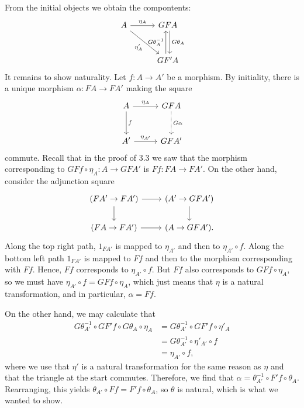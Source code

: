 From the initial objects we obtain the compontents:
\[\begin{tikzcd}[row sep=1cm, column sep=1cm]
	A\ar[r, "\eta_A"]\ar[dr, "\eta'_A" below left] & GFA\ar[d, shift left, "G\theta_A" right]\\
	& GF'A\ar[u, shift left, "G\theta^{-1}_A" left]
\end{tikzcd}\]
It remains to show naturality. Let $f\colon A\to A'$ be a morphism. By initiality,
there is a unique morphism $\alpha\colon FA\to FA'$ making the square
\[\begin{tikzcd}[row sep=1cm, column sep=1cm]
	A\ar[r, "\eta_A"]\ar[d, "f"] & GFA\ar[d, "G\alpha", densely dotted]\\
	A'\ar[r, "\eta_{A'}"]& GFA'
\end{tikzcd}\]
commute. Recall that in the proof of 3.3 we saw that the morphism corresponding
to $GFf \circ \eta_A\colon A\to GFA'$ is $Ff\colon FA\to FA'$. On the other hand,
consider the adjunction square
\[\begin{tikzcd}
	(FA'\to FA')\ar[r]\ar[d] & (A'\to GFA')\ar[d]\\
	(FA\to FA')\ar[r] & (A\to GFA').
\end{tikzcd}\]
Along the top right path, $1_{FA'}$ is mapped to $\eta_{A'}$ and then to
$\eta_{A'}\circ f$. Along the bottom left path $1_{FA'}$ is mapped to $Ff$ and
then to the morphism corresponding with $Ff$. Hence, $Ff$ corresponds to
$\eta_{A'}\circ f$. But $Ff$ also corresponds to $GFf \circ \eta_A$, so
we must have $\eta_{A'} \circ f = GFf \circ \eta_A$, which just means that
$\eta$ is a natural transformation, and in particular, $\alpha = Ff$.

On the other hand, we may calculate that
\begin{align*}
	G\theta_{A'}^{-1} \circ GF'f \circ G\theta_A \circ \eta_A &=
	G\theta_{A'}^{-1} \circ GF'f \circ \eta'_A\\
	&= G\theta^{-1}_{A'}\circ \eta'_{A'} \circ f\\
	&= \eta_{A'} \circ f,
\end{align*}
where we use that $\eta'$ is a natural transformation for the same reason as
$\eta$ and that the triangle at the start commutes.
Therefore, we find that $\alpha = \theta_{A'}^{-1} \circ F'f \circ \theta_A	$.
Rearranging, this yields $\theta_{A'} \circ Ff = F'f \circ \theta_A$, so
$\theta$ is natural, which is what we wanted to show.
